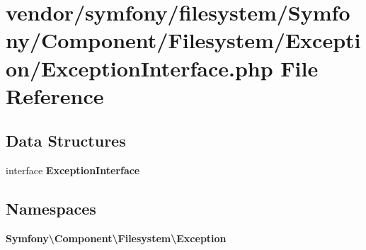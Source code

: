 \section{vendor/symfony/filesystem/\+Symfony/\+Component/\+Filesystem/\+Exception/\+Exception\+Interface.php File Reference}
\label{symfony_2filesystem_2_symfony_2_component_2_filesystem_2_exception_2_exception_interface_8php}
\subsection*{Data Structures}
\begin{DoxyCompactItemize}
\item 
interface {\bf Exception\+Interface}
\end{DoxyCompactItemize}
\subsection*{Namespaces}
\begin{DoxyCompactItemize}
\item 
 {\bf Symfony\textbackslash{}\+Component\textbackslash{}\+Filesystem\textbackslash{}\+Exception}
\end{DoxyCompactItemize}

